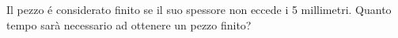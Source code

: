 \begin{questions}
{Il pezzo é considerato finito se il suo spessore non eccede i 5 millimetri.
Quanto tempo sarà necessario ad ottenere un pezzo finito?
}

%	
%				
%			


\end{questions}
